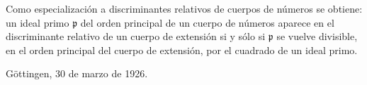 \documentclass[11pt]{article}
\providecommand{\mpideal}{\mathfrak{p}}
\begin{document}
Como especialización a discriminantes relativos de cuerpos de números se obtiene: un ideal primo $\mpideal$ del orden principal de un cuerpo de números aparece en el discriminante relativo de un cuerpo de extensión si y sólo si $\mpideal$ se vuelve divisible, en el orden principal del cuerpo de extensión, por el cuadrado de un ideal primo.

Göttingen, 30 de marzo de 1926.
\end{document}
